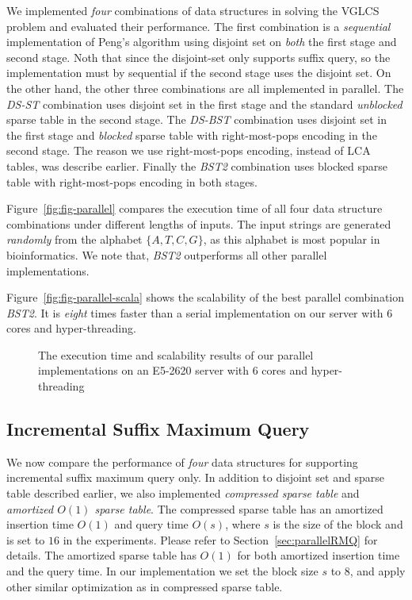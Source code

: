 We implemented {\em four} combinations of data structures in solving
the VGLCS problem and evaluated their performance.  The first
combination is a {\em sequential} implementation of Peng's algorithm
using disjoint set on {\em both} the first stage and second stage.
Noth that since the disjoint-set only supports suffix query, so the
implementation must by sequential if the second stage uses the
disjoint set.  On the other hand, the other three combinations are all
implemented in parallel.  The {\em DS-ST} combination uses disjoint
set in the first stage and the standard {\em unblocked} sparse table
in the second stage.  The {\em DS-BST} combination uses disjoint set
in the first stage and {\em blocked} sparse table with right-most-pops
encoding in the second stage.  The reason we use right-most-pops
encoding, instead of LCA tables, was describe earlier.  Finally the
{\em BST2} combination uses blocked sparse table with right-most-pops
encoding in both stages.

Figure~\ref{fig:fig-parallel} compares the execution time of all four
data structure combinations under different lengths of inputs.  The
input strings are generated {\em randomly} from the alphabet $\{A, T,
C, G\}$, as this alphabet is most popular in bioinformatics.  We note
that, {\em BST2} outperforms all other parallel implementations. %

Figure~\ref{fig:fig-parallel-scala} shows the scalability of the best
parallel combination {\em BST2}.  It is {\em eight} times faster than
a serial implementation on our server with 6 cores and
hyper-threading.

\begin{figure}
  \centering
  \caption{The execution time and scalability results of our parallel
    implementations on an E5-2620 server with 6 cores and
    hyper-threading}
\end{figure}


\subsection{Incremental Suffix Maximum Query}

We now compare the performance of {\em four} data structures for
supporting incremental suffix maximum query only.  In addition to
disjoint set and sparse table described earlier, we also implemented
{\em compressed sparse table} and {\em amortized $O(1)$ sparse table}.
The compressed sparse table has an amortized insertion time $O(1)$ and
query time $O(s)$, where $s$ is the size of the block and is set to $16$
in the experiments.  Please refer to Section~\ref{sec:parallelRMQ} for
details.  The amortized sparse table has $O(1)$ for both amortized
insertion time and the query time.  In our implementation we set the
block size $s$ to $8$, and apply other similar optimization as in
compressed sparse table.

